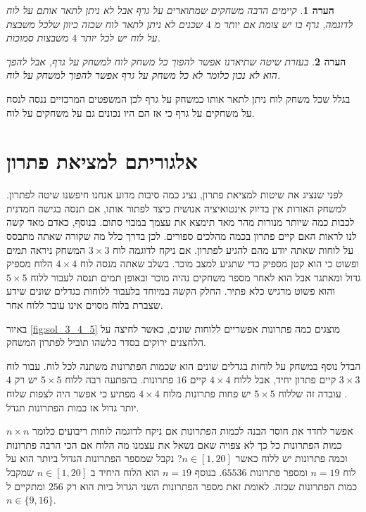 \documentclass[12pt,twoside]{article}
\newtheorem{comm}{הערה}[section]
\begin{document}
\begin{comm}
    קיימים הרבה משחקים שמתוארים על גרף אבל לא ניתן לתאר אותם על לוח
    לדוגמה,
    גרף בו יש צומת אם יותר מ
    $4$
    שכנים לא ניתן לתאר לוח שכזה כיוון שלכל משבצת על לוח
    יש לכל יותר 
    $4$
    משבצות סמוכות.
\end{comm}

\begin{comm}
    בעזרת שיטה שתיארנו אפשר להפוך כל משחק לוח למשחק על גרף, אבל להפך הוא לא נכון 
    כלומר לא כל משחק על גרף אפשר להפוך למשחק על לוח.
\end{comm}

בגלל שכל משחק לוח ניתן לתאר אותו כמשחק על גרף לכן המשפטים המרכזיים ננסה לנסח על משחקים על גרף כי אז הם היו נכונים
גם על משחקים על לוח.


\newpage

\section{ אלגוריתם למציאת פתרון}

לפני שנציג את שיטות למציאת פתרון, נציג כמה סיבות מדוע אנחנו חיפשנו שיטה
לפתרון.
למשחק האורות אין בדיוק אינטואיציה אנושית כיצד לפתור אותו,
אם תנסה בגישה חמדנית לכבות כמה שיותר מנורות מהר מאד תימצא את עצמך במבוי סתום.
בנוסף,
כאדם מאד קשה לנו לראות האם קיים פתרון בכמה מהלכים ספורים. 
לכן בדרך כלל מה שקורה שאתה מתבסס על לוחות שאתה יודע מהם להגיע לפתרון.
אם ניקח לדוגמה לוח 
$3 \times 3$
המשחק ניראה תמים ופשוט כי הוא קטן מספיק כדי שתגיע למצב מוכר. בשלב שאתה מנסה לוח 
$4 \times 4$
הלוח
מספיק גדול ומאתגר
אבל הוא לאחר מספר משחקים נהיה מוכר ובאופן תמים תנסה לעבור ללוח
$5 \times 5$
והוא פשוט מרגיש כלא פתיר.
החלק הקשה במיוחד בלעבור ללוחות בגדלים שונים  שידע 
שצברת בלוח מסוים אינו עובר ללוח אחר.

באיור
\ref{fig:sol_3_4_5}
מוצגים כמה פתרונות אפשריים ללוחות שונים, כאשר לחיצה על הלחצנים ירוקים
בסדר כלשהו תוביל לפתרון המשחק.

הבדל נוסף במשחק על לוחות בגדלים שונים הוא שכמות הפתרונות משתנה לכל לוח.
עבור לוח 
$3 \times 3$
קיים פתרון יחיד,
אבל ללוח 
$4 \times 4$
קיים
$16$
פתרונות.
בהפתעה רבה ללוח 
$5 \times 5$
יש רק 
$4$.
עובדה זה שללוח 
$5 \times 5$
יש פחות פתרונות מלוח 
$4 \times 4$
מפתיע כי אפשר היה לצפות שלוח יותר גדול אז כמות הפתרונות תגדל.

אפשר לחדד את חוסר הבנה לכמות הפתרונות אם ניקח לדוגמה לוחות ריבועים כלומר
$n \times n$
כמות הפתרונות כל כך לא צפויה
שאם נשאל את עצמנו מה הלוח אם הכי הרבה פתרונות וכמה פתרונות יש ללוח כאשר 
$n \in [1,20]$?
נקבל שמספר הפתרונות הגדול ביותר הוא על לוח
$n = 19$ 
ומספר פתרונות 
$65536$.
בנוסף
$n = 19$ 
הוא הלוח היחיד ב
$n \in [1,20]$
שמקבל
כמות הפתרונות שכזה.
לאומת זאת
מספר הפתרונות השני הגדול ביות הוא רק
$256$
ומתקיים ל
$n \in \{9, 16 \}$.
\end{document}
